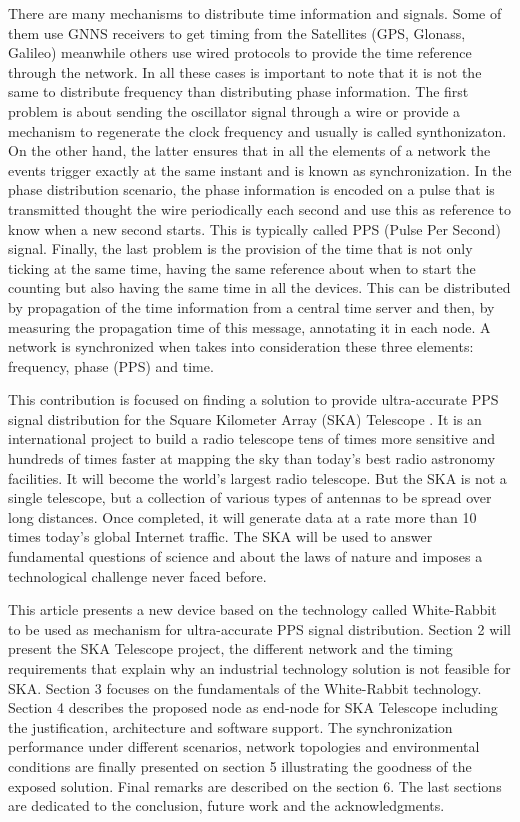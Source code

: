 \documentclass[review]{elsarticle}
\begin{document}
There are many mechanisms to distribute time information and signals. Some of them use GNNS receivers to get timing from the Satellites (GPS, Glonass, Galileo) meanwhile others use wired protocols to provide the time reference through the network. In all these cases is important to note that it is not the same to distribute frequency than distributing phase information. The first problem is about sending the oscillator signal through a wire or provide a mechanism to regenerate the clock frequency and usually is called synthonizaton. On the other hand, the latter ensures that in all the elements of a network the events trigger exactly at the same instant and is known as synchronization. In the phase distribution scenario, the phase information is encoded on a pulse that is transmitted thought the wire periodically each second and use this as reference to know when a new second starts. This is typically called PPS (Pulse Per Second) signal. Finally, the last problem is the provision of the time that is not only ticking at the same time, having the same reference about when to start the counting but also having the same time in all the devices. This can be distributed by propagation of the time information from a central time server and then, by measuring the propagation time of this message, annotating it in each node. A network is synchronized when takes into consideration these three elements: frequency, phase (PPS) and time.

This contribution is focused on finding a solution to provide ultra-accurate PPS signal distribution for the Square Kilometer Array (SKA) Telescope \cite{ska:project_website}. It is an international project to build a radio telescope tens of times more sensitive and hundreds of times faster at mapping the sky than today’s best radio astronomy facilities. It will become the world’s largest radio telescope. But the SKA is not a single telescope, but a collection of various types of antennas to be spread over long distances. Once completed, it will generate data at a rate more than 10 times today’s global Internet traffic. The SKA will be used to answer fundamental questions of science and about the laws of nature and imposes a technological challenge never faced before. 

This article presents a new device based on the technology called White-Rabbit \cite{ohwr:wr_wiki} to be used as mechanism for ultra-accurate PPS signal distribution. Section 2 will present the SKA Telescope project, the different network and the timing requirements that explain why an industrial technology solution is not feasible for SKA. Section 3 focuses on the fundamentals of the White-Rabbit technology. Section 4 describes the proposed node as end-node for SKA Telescope including the justification, architecture and software support. The synchronization performance under different scenarios, network topologies and environmental conditions are finally presented on section 5 illustrating the goodness of the exposed solution. Final remarks are described on the section 6. The last sections are dedicated to the conclusion, future work and the acknowledgments.
\end{document}
